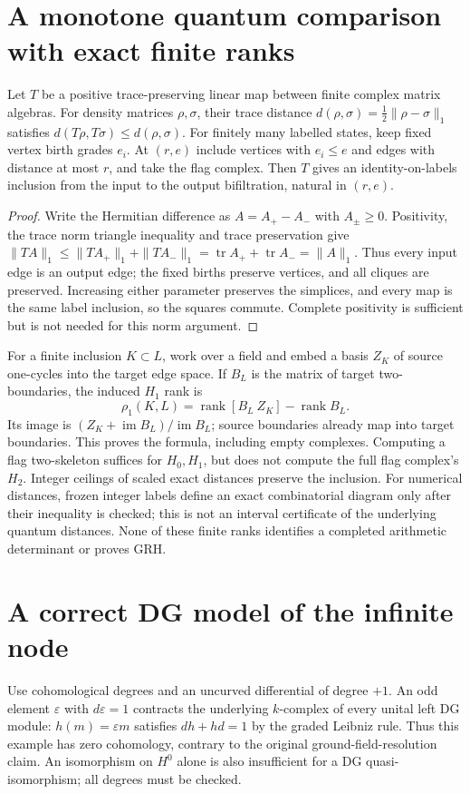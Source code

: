 \section{A monotone quantum comparison with exact finite ranks}
\begin{proposition}\label{thm:channel-filtration}
Let $T$ be a positive trace-preserving linear map between finite complex
matrix algebras. For density matrices $\rho,\sigma$, their trace distance
$d(\rho,\sigma)=\tfrac12\|\rho-\sigma\|_1$ satisfies
$d(T\rho,T\sigma)\le d(\rho,\sigma)$.
For finitely many labelled states, keep fixed vertex birth grades $e_i$.
At $(r,e)$ include vertices with $e_i\le e$ and edges with distance at most
$r$, and take the flag complex. Then $T$ gives an identity-on-labels inclusion
from the input to the output bifiltration, natural in $(r,e)$.
\end{proposition}
\begin{proof}
Write the Hermitian difference as $A=A_+-A_-$ with $A_\pm\ge0$.
Positivity, the trace norm triangle inequality and trace preservation give
$\|T A\|_1\le\|T A_+\|_1+\|T A_-\|_1
=\operatorname{tr}A_++\operatorname{tr}A_-=\|A\|_1$.
Thus every input edge is an output edge; the fixed births preserve vertices,
and all cliques are preserved. Increasing either parameter preserves the
simplices, and every map is the same label inclusion, so the squares commute.
Complete positivity is sufficient but is not needed for this norm argument.
\end{proof}
For a finite inclusion $K\subset L$, work over a field and embed a basis
$Z_K$ of source one-cycles into the target edge space. If $B_L$ is the
matrix of target two-boundaries, the induced $H_1$ rank is
\[
 \rho_1(K,L)=\operatorname{rank}[B_L\ Z_K]-\operatorname{rank}B_L.
\]
Its image is $(Z_K+\operatorname{im}B_L)/\operatorname{im}B_L$; source
boundaries already map into target boundaries. This proves the formula,
including empty complexes. Computing a flag two-skeleton suffices for
$H_0,H_1$, but does not compute the full flag complex's $H_2$.
Integer ceilings of scaled exact distances preserve the inclusion.
For numerical distances, frozen integer labels define an exact combinatorial
diagram only after their inequality is checked; this is not an interval
certificate of the underlying quantum distances. None of these finite ranks
identifies a completed arithmetic determinant or proves GRH.

\section{A correct DG model of the infinite node}
Use cohomological degrees and an uncurved differential of degree $+1$.
An odd element $\varepsilon$ with $d\varepsilon=1$ contracts the underlying $k$-complex of every unital
left DG module: $h(m)=\varepsilon m$ satisfies $dh+hd=1$ by the graded
Leibniz rule. Thus this example has zero cohomology, contrary to the
original ground-field-resolution claim. An isomorphism on $H^0$ alone is
also insufficient for a DG quasi-isomorphism; all degrees must be checked.

